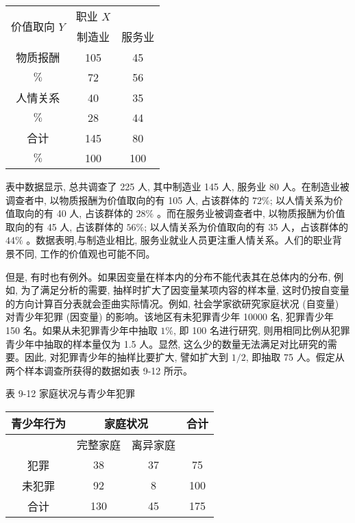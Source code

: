 \documentclass[10pt]{article}
\begin{document}
\begin{CJK*}{UTF8}{bsmi}
\begin{center}
\begin{tabular}{ccc}
\hline
\multirow{2}{*}{价值取向 $Y$} & 职业 $X$ &  \\
\cline { 2 - 3 }
 & 制造业 & 服务业 \\
\hline
物质报酬 & 105 & 45 \\
$\%$ & 72 & 56 \\
人情关系 & 40 & 35 \\
$\%$ & 28 & 44 \\
合计 & 145 & 80 \\
$\%$ & 100 & 100 \\
\hline
\end{tabular}
\end{center}

表中数据显示, 总共调查了 225 人, 其中制造业 145 人, 服务业 80 人。在制造业被调查者中, 以物质报酬为价值取向的有 105 人, 占该群体的 $72 \%$; 以人情关系为价值取向的有 40 人, 占该群体的 $28 \%$ 。而在服务业被调查者中, 以物质报酬为价值取向的有 45 人, 占该群体的 $56 \%$; 以人情关系为价值取向的有 35 人，占该群体的 $44 \%$ 。数据表明,与制造业相比, 服务业就业人员更注重人情关系。人们的职业背景不同, 工作的价值观也可能不同。

但是, 有时也有例外。如果因变量在样本内的分布不能代表其在总体内的分布, 例如, 为了满足分析的需要, 抽样时扩大了因变量某项内容的样本量, 这时仍按自变量的方向计算百分表就会歪曲实际情况。例如, 社会学家欲研究家庭状况 (自变量) 对青少年犯罪 (因变量) 的影响。该地区有未犯罪青少年 10000 名, 犯罪青少年 150 名。如果从未犯罪青少年中抽取 $1 \%$, 即 100 名进行研究, 则用相同比例从犯罪青少年中抽取的样本量仅为 1.5 人。显然, 这么少的数量无法满足对比研究的需要。因此, 对犯罪青少年的抽样比要扩大, 譬如扩大到 $1 / 2$, 即抽取 75 人。假定从两个样本调查所获得的数据如表 9-12 所示。

表 9-12 家庭状况与青少年犯罪

\begin{center}
\begin{tabular}{|c|c|c|c|}
\hline
\multirow{2}{*}{青少年行为} & \multicolumn{2}{|c|}{家庭状况} & \multirow{2}{*}{合计} \\
\hline
 & 完整家庭 & 离异家庭 &  \\
\hline
犯罪 & 38 & 37 & 75 \\
\hline
未犯罪 & 92 & 8 & 100 \\
\hline
合计 & 130 & 45 & 175 \\
\hline
\end{tabular}
\end{center}


\end{CJK*}
\end{document}
